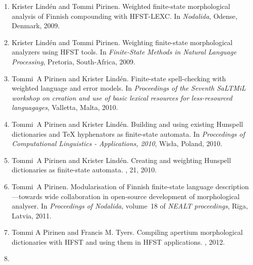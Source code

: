 \documentclass[officiallayout]{unihelcompling}
\begin{document}
\begin{enumerate}
    \item[\citetalias{pirinen2009weighted}]
        Krister Lindén and Tommi Pirinen.
        \newblock Weighted finite-state morphological analysis of Finnish 
        compounding with HFST-LEXC.
        \newblock In \emph{Nodalida}, Odense, Denmark, 2009.
    \item[\citetalias{pirinen2009weighting}]
        Krister Lindén and Tommi Pirinen.
        \newblock Weighting finite-state morphological analyzers using HFST
        tools.
        \newblock In \emph{Finite-State Methods in Natural Language Processing},
        Pretoria, South-Africa, 2009.
    \item[\citetalias{pirinen2010finitestate}]
        Tommi~A Pirinen and Krister Lindén.
        \newblock Finite-state spell-checking with weighted language and error
        models.
        \newblock In {\em Proceedings of the Seventh SaLTMiL workshop on 
            creation and use of basic lexical resources for less-resourced 
        languagages}, Valletta, Malta, 2010.
    \item[\citetalias{pirinen2010building}]
        Tommi~A Pirinen and Krister Lindén.
        \newblock Building and using existing Hunspell dictionaries and {\TeX }
        hyphenators as finite-state automata.
        \newblock In {\em Proccedings of Computational Linguistics -
            Applications, 2010}, Wis{\l}a, Poland, 2010.
    \item[\citetalias{pirinen2010creating}]
        Tommi~A Pirinen and Krister Lindén.
        \newblock Creating and weighting Hunspell dictionaries as finite-state
        automata.
        , 21, 2010.
    \item[\citetalias{pirinen2011modularisation}]
        Tommi~A Pirinen.
        \newblock Modularisation of Finnish finite-state language 
        description—towards wide collaboration in open-source development of
        morphological analyser.
        \newblock In {\em Proceedings of Nodalida}, volume~18 of {\em NEALT
        proceedings}, Rīga, Latvia, 2011.
    \item[\citetalias{pirinen2012compiling}]
        Tommi A Pirinen and Francis M. Tyers.
        \newblock Compiling apertium morphological dictionaries with HFST and
        using them in HFST applications.
        , 2012.
    \item[\citetalias{pirinen2012improving}]

\end{enumerate}
\end{document}
